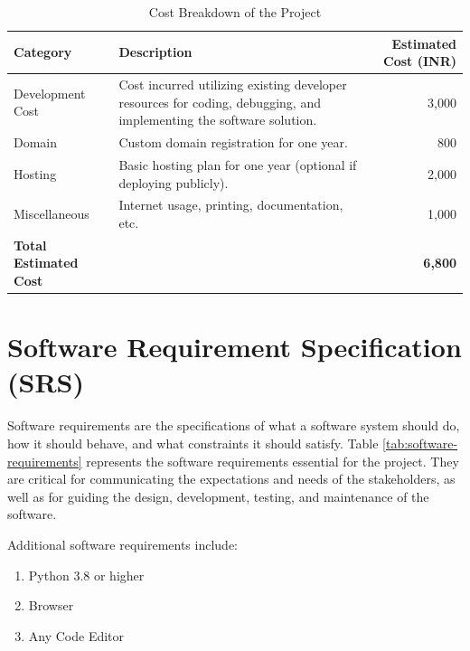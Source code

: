 \documentclass[12pt,a4paper]{report}
\begin{document}
\begin{table}[H]
    \centering
    \begin{tabular}{|l|p{8cm}|r|}
        \hline
        \textbf{Category} & \textbf{Description} & \textbf{Estimated Cost (INR)} \\ \hline
        Development Cost & Cost incurred utilizing existing developer resources for coding, debugging, and implementing the software solution. & 3,000 \\ \hline
        Domain & Custom domain registration for one year. & 800 \\ \hline
        Hosting & Basic hosting plan for one year (optional if deploying publicly). & 2,000 \\ \hline
        Miscellaneous & Internet usage, printing, documentation, etc. & 1,000 \\ \hline
        \textbf{Total Estimated Cost} &  & \textbf{6,800} \\ \hline
    \end{tabular}
    \caption{Cost Breakdown of the Project}
    \label{tab:cost-breakdown}
\end{table}

\section{Software Requirement Specification (SRS)}
Software requirements are the specifications of what a software system should do, how it should behave, and what constraints it should satisfy. Table \ref{tab:software-requirements} represents the software requirements essential for the project. They are critical for communicating the expectations and needs of the stakeholders, as well as for guiding the design, development, testing, and maintenance of the software.

Additional software requirements include:
\begin{enumerate}
    \item Python 3.8 or higher
    \item Browser
    \item Any Code Editor
\end{enumerate}
\end{document}
